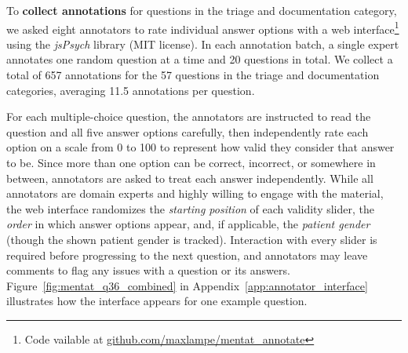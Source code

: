 To \textbf{collect annotations} for questions in the triage and documentation category, we asked eight 
annotators to rate individual answer options with a web interface\footnote{Code vailable at \href{https://github.com/maxlampe/mentat_annotate}{github.com/maxlampe/mentat\_annotate}} using the \textit{jsPsych} library \citep{de_Leeuw2023} (MIT license).
In each annotation batch, a single expert annotates one random question at a time and 20 questions in total. 
We collect a total of 657 annotations for the 57 questions in the triage and documentation categories, averaging 11.5 annotations per question.

For each multiple-choice question, the annotators are instructed to read the question and all five answer options carefully, then independently rate each option on a scale from 0 to 100 to represent how valid they consider that answer to be. 
Since more than one option can be correct, incorrect, or somewhere in between, annotators are asked to treat each answer independently.
While all annotators are domain experts and highly willing to engage with the material, the web interface randomizes the \emph{starting position} of each validity slider, the \emph{order} in which answer options appear, and, if applicable, the \emph{patient gender} (though the shown patient gender is tracked). 
Interaction with every slider is required before progressing to the next question, and annotators may leave comments to flag any issues with a question or its answers. Figure~\ref{fig:mentat_q36_combined} in Appendix~\ref{app:annotator_interface} illustrates how the interface appears for one example question.

